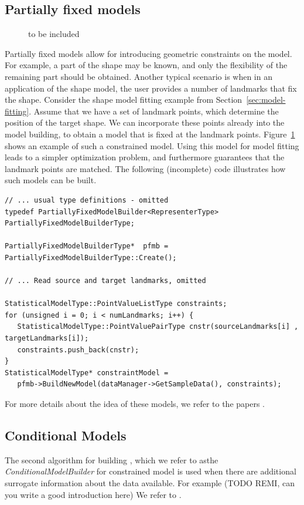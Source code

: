\documentclass{InsightArticle}
\begin{document}
\subsection{Partially fixed models}
\begin{figure}
  to be included
    \label{fig:constrained-model}
\end{figure}
Partially fixed models allow for introducing geometric constraints on the model. For example, a part of the shape may be known, and only the flexibility of the remaining part should be obtained. Another typical scenario is when in an application of the shape model, the user provides a number of landmarks that fix the shape. 
Consider the shape model fitting example from Section~\ref{sec:model-fitting}. Assume that we have a set of landmark points, which determine the position of the target shape. We can incorporate these points already into the model building, to obtain a model that is fixed at the landmark points. Figure~\ref{fig:constrained-model} shows an example of such a  constrained model.  Using this model for model fitting leads to a simpler optimization problem, and furthermore guarantees that the landmark points are matched. 
The following (incomplete) code illustrates how such models can be built. 

\begin{verbatim}
// ... usual type definitions - omitted
typedef PartiallyFixedModelBuilder<RepresenterType> PartiallyFixedModelBuilderType;

PartiallyFixedModelBuilderType*  pfmb = PartiallyFixedModelBuilderType::Create();

// ... Read source and target landmarks, omitted

StatisticalModelType::PointValueListType constraints;
for (unsigned i = 0; i < numLandmarks; i++) { 
   StatisticalModelType::PointValuePairType cnstr(sourceLandmarks[i] , targetLandmarks[i]);
   constraints.push_back(cnstr);
}
StatisticalModelType* constraintModel = 
   pfmb->BuildNewModel(dataManager->GetSampleData(), constraints);
\end{verbatim}

For more details about the idea of these models, we refer to the papers \cite{Mathsurface, PriorDeformation}.

\subsection{Conditional Models}
The second algorithm for building , which we refer to asthe \emph{ConditionalModelBuilder} for constrained model is used when there are additional surrogate information about the data available. For example (TODO REMI, can you write a good introduction here)
We refer to \cite{TODO cite remi's paper}. 
\end{document}

